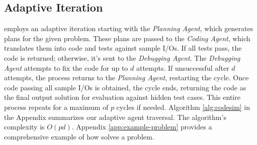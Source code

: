 


\smallskip
\subsection{Adaptive Iteration}
\label{sec:agent-traverse}


\tool employs an adaptive iteration starting with the \emph{Planning Agent}, which generates plans for the given problem. These plans are passed to the \emph{Coding Agent}, which translates them into code and tests against sample I/Os. If all tests pass, the code is returned; otherwise, it's sent to the \emph{Debugging Agent}. The \emph{Debugging Agent} attempts to fix the code for up to $d$ attempts. If unsuccessful after $d$ attempts, the process returns to the \emph{Planning Agent}, restarting the cycle. Once code passing all sample I/Os is obtained, the cycle ends, returning the code as the final output solution for evaluation against hidden test cases. This entire process repeats for a maximum of $p$ cycles if needed. Algorithm \ref{alg:codesim} in the Appendix summarizes our adaptive agent traversal. The algorithm's complexity is $O(pd)$. Appendix \ref{app:example-problem} provides a comprehensive example of how \tool solves a problem. 



